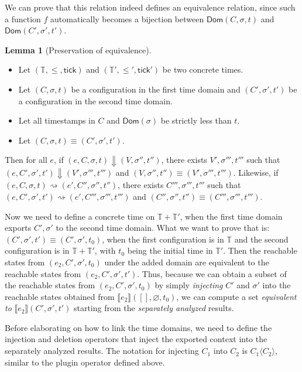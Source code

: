 \documentclass{article}
\theoremstyle{definition}
\newtheorem{lem}{Lemma}[section]
\newcommand*{\Time}{\mathbb{T}}
\newcommand*{\sembracket}[1]{\lBrack{#1}\rBrack}
\newcommand*{\tick}{\mathsf{tick}}
\newcommand*{\inject}[2]{{#1}\langle{#2}\rangle}
\begin{document}
We can prove that this relation indeed defines an equivalence relation, since such a function $f$ automatically becomes a bijection between $\mathsf{Dom}(C,\sigma,t)$ and $\mathsf{Dom}(C',\sigma',t')$.

\begin{lem}[Preservation of equivalence]
  $\:$

  \begin{itemize}
    \item Let $(\Time,\le,\tick)$ and $(\Time',\le',\tick')$ be two concrete times.
    \item Let $(C,\sigma,t)$ be a configuration in the first time domain and $(C',\sigma',t')$ be a configuration in the second time domain.
    \item Let all timestamps in $C$ and $\mathsf{Dom}(\sigma)$ be strictly less than $t$.
    \item Let $(C,\sigma,t)\equiv (C',\sigma',t')$.
  \end{itemize}

  Then for all $e$, if $(e,C,\sigma,t)\Downarrow(V,\sigma'',t'')$, there exists $V',\sigma''',t'''$ such that $(e,C',\sigma',t')\Downarrow(V',\sigma''',t''')$ and $(V,\sigma'',t'')\equiv(V',\sigma''',t''')$.
  Likewise, if $(e,C,\sigma,t)\rightsquigarrow(e',C'',\sigma'',t'')$, there exists $C''',\sigma''',t'''$ such that $(e,C',\sigma',t')\rightsquigarrow(e',C''',\sigma''',t''')$ and $(C'',\sigma'',t'')\equiv(C''',\sigma''',t''')$.
\end{lem}

Now we need to define a concrete time on $\Time+\Time'$, when the first time domain exports $C',\sigma'$ to the second time domain.
What we want to prove that is: $(C',\sigma',t')\equiv(C',\sigma',t_{0})$, when the first configuration is in $\Time$ and the second configuration is in $\Time+\Time'$, with $t_{0}$ being the initial time in $\Time'$.
Then the reachable states from $(e_{2},C',\sigma',t_{0})$ under the added domain are equivalent to the reachable states from $(e_{2},C',\sigma',t')$.
Thus, because we can obtain a subset of the reachable states from $(e_{2},C',\sigma',t_{0})$ by simply \emph{injecting} $C'$ and $\sigma'$ into the reachable states obtained from $\sembracket{e_{2}}([],\varnothing,t_{0})$, we can compute a set \textit{equivalent to} $\sembracket{e_{2}}(C',\sigma',t')$ starting from the \emph{separately analyzed} results.

Before elaborating on how to link the time domains, we need to define the injection and deletion operators that inject the exported context into the separately analyzed results.
The notation for injecting $C_{1}$ into $C_{2}$ is $\inject{C_{1}}{C_{2}}$, similar to the plugin operator defined above.
\end{document}
